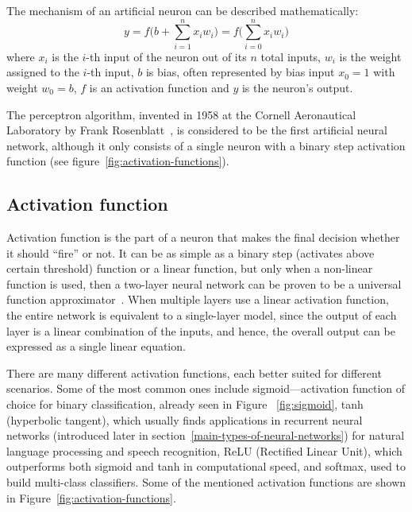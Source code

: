 The mechanism of an artificial neuron can be described mathematically:
\begin{equation}
\label{eq:neuron}
    y = f \bigg( b + \sum_{i=1}^n x_i w_i \bigg)
    =
    f \bigg( \sum_{i=0}^n x_i w_i \bigg)%
\end{equation}
where $x_i$ is the $i$-th input of the neuron out of its $n$ total inputs,
$w_i$ is the weight assigned to the $i$-th input,
$b$ is bias, often represented by bias input $x_0 = 1$ with weight $w_0 = b$,
$f$ is an activation function and $y$ is the neuron's output.

The perceptron algorithm,
invented in 1958 at the Cornell Aeronautical Laboratory by Frank Rosenblatt~\cite{rosenblatt1958perceptron},
is considered to be the first artificial neural network, although it only consists of a single neuron with
a binary step activation function (see figure~\ref{fig:activation-functions}).


\subsection*{Activation function}
\label{activation-function}
Activation function is the part of a neuron that makes the final decision whether it should ``fire'' or not.
It can be as simple as a binary step (activates above certain threshold) function or a linear function,
but only when a non-linear function is used, then a two-layer neural network can be proven to be
a universal function approximator~\cite{cybenko1989approximation}. When multiple layers use
a linear activation function, the entire network is equivalent to a single-layer model,
since the output of each layer is a linear combination of the inputs, and hence, the overall output can be expressed as a single linear equation.

There are many different activation functions, each better suited for different scenarios.
Some of the most common ones include sigmoid---activation
function of choice for binary classification, already seen in Figure ~\ref{fig:sigmoid},
tanh (hyperbolic tangent), which usually finds applications
in recurrent neural networks (introduced later in section~\ref{main-types-of-neural-networks})
for natural language processing and speech recognition,
ReLU (Rectified Linear Unit),
which outperforms both sigmoid and tanh in computational speed,
and softmax, used to build multi-class classifiers.
Some of the mentioned activation functions are shown in Figure~\ref{fig:activation-functions}.

